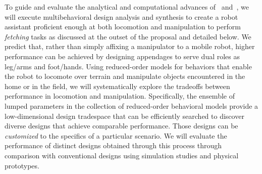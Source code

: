 \documentclass[11pt]{article}
\begin{document}
To guide and evaluate the analytical and computational advances of~ and~,
we will execute multibehavioral design analysis and synthesis to create a robot assistant proficient enough at both locomotion and manipulation to perform \emph{fetching} tasks as discussed at the outset of the proposal and detailed below.
We predict that, rather than simply affixing a manipulator to a mobile robot, higher performance can be achieved by designing appendages to serve dual roles as leg/arms and foot/hands.
Using reduced-order models for behaviors that enable the robot to locomote over terrain and manipulate objects encountered in the home or in the field, we will systematically explore the tradeoffs between performance in locomotion and manipulation.
Specifically, the ensemble of lumped parameters in the collection of reduced-order behavioral models provide a low-dimensional design tradespace that can be efficiently searched to discover diverse designs that achieve comparable performance.
Those designs can be \emph{customized} to the specifics of a particular scenario. 
We will evaluate the performance of distinct designs obtained through this process through comparison with conventional designs using simulation studies and physical prototypes.
\end{document}
